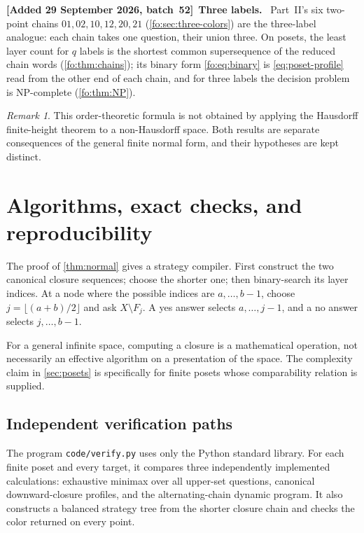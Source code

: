 \documentclass[11pt,letterpaper]{article}
\numberwithin{equation}{section}
\theoremstyle{definition}
\theoremstyle{remark}
\newtheorem{remark}[remark]{Remark}
\theoremstyle{definition}
\newenvironment{writenote}[1][]{\par\smallskip\begingroup\small\sloppy
 \noindent\textbf{[Added 29 September 2026, batch~52]}\if\relax\detokenize{#1}\relax\else~\textbf{#1.}\fi\ }%
 {\par\endgroup\smallskip}
\begin{document}
\begin{writenote}[Three labels]
Part~II's six two-point chains $01,02,10,12,20,21$ (\cref{fo:sec:three-colors})
are the three-label analogue: each chain takes one question, their union
three. On posets, the least layer count for $q$ labels is the shortest common
supersequence of the reduced chain words (\cref{fo:thm:chains}); its binary
form \eqref{fo:eq:binary} is \eqref{eq:poset-profile} read from the other end of
each chain, and for three labels the decision problem is NP-complete
(\cref{fo:thm:NP}).
\end{writenote}

\begin{remark}
This order-theoretic formula is not obtained by applying the Hausdorff
finite-height theorem to a non-Hausdorff space. Both results are separate
consequences of the general finite normal form, and their hypotheses are kept
distinct.
\end{remark}

\section{Algorithms, exact checks, and reproducibility}\label{sec:checks}

The proof of \cref{thm:normal} gives a strategy compiler. First construct the two
canonical closure sequences; choose the shorter one; then binary-search its
layer indices. At a node where the possible indices are $a,\ldots,b-1$, choose
$j=\lfloor(a+b)/2\rfloor$ and ask $X\setminus F_j$. A yes answer selects
$a,\ldots,j-1$, and a no answer selects $j,\ldots,b-1$.

For a general infinite space, computing a closure is a mathematical operation,
not necessarily an effective algorithm on a presentation of the space. The
complexity claim in \cref{sec:posets} is specifically for finite posets whose
comparability relation is supplied.

\subsection{Independent verification paths}

The program \texttt{code/verify.py} uses only the Python standard library.
For each finite poset and every target, it compares three independently
implemented calculations: exhaustive minimax over all upper-set questions,
canonical downward-closure profiles, and the alternating-chain dynamic program.
It also constructs a balanced strategy tree from the shorter closure chain and
checks the color returned on every point.
\end{document}
